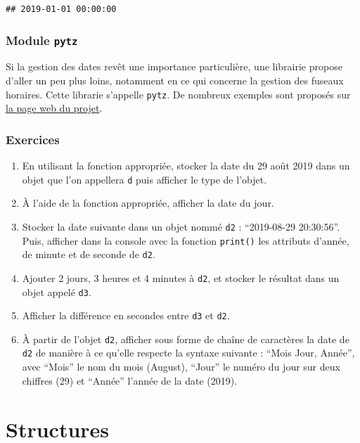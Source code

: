 \documentclass[
  12pt,
]{book}
\makeatletter
\providecommand{\tightlist}{%
  \setlength{\itemsep}{0pt}\setlength{\parskip}{0pt}}
\numberwithin{equation}{section}
\numberwithin{countremarque}{section}
\newcounter{exercices}[section]
\newenvironment{exframe}{%
 \def\at@end@of@exframe{}%
 \ifinner\ifhmode%
  \def\at@end@of@exframe{\end{minipage}}%
  \begin{minipage}{\columnwidth}%
 \fi\fi%
 \def\FrameCommand##1{\hskip\@totalleftmargin \hskip-\fboxsep
 \colorbox{shadecolorex}{##1}\hskip-\fboxsep
     \hskip-\linewidth \hskip-\@totalleftmargin \hskip\columnwidth}%
 \MakeFramed {\advance\hsize-\width
   \@totalleftmargin\z@ \linewidth\hsize
   \@setminipage}}%
 {\par\unskip\endMakeFramed%
 \at@end@of@exframe}
\makeatother
\begin{document}
\begin{lstlisting}
## 2019-01-01 00:00:00
\end{lstlisting}

\subsection{\texorpdfstring{Module \texttt{pytz}}{Module pytz}}\label{module-pytz}

Si la gestion des dates revêt une importance particulière, une librairie propose d'aller un peu plus loins, notamment en ce qui concerne la gestion des fuseaux horaires. Cette librarie s'appelle \texttt{pytz}. De nombreux exemples sont proposés sur \href{https://pypi.org/project/pytz/}{la page web du projet}.

\subsection{Exercices}\label{exercices}

\begin{exframe}
\begin{enumerate}
\def\labelenumi{\arabic{enumi}.}
\tightlist
\item
  En utilisant la fonction appropriée, stocker la date du 29 août 2019 dans un objet que l'on appellera
  \texttt{d} puis afficher le type de l'objet.
\item
  À l'aide de la fonction appropriée, afficher la date du jour.
\item
  Stocker la date suivante dans un objet nommé \texttt{d2} : ``2019-08-29 20:30:56''. Puis, afficher dans la console avec la fonction \texttt{print()} les attributs d'année, de minute et de seconde de \texttt{d2}.
\item
  Ajouter 2 jours, 3 heures et 4 minutes à \texttt{d2}, et stocker le résultat dans un objet appelé \texttt{d3}.
\item
  Afficher la différence en secondes entre \texttt{d3} et \texttt{d2}.
\item
  À partir de l'objet \texttt{d2}, afficher sous forme de chaîne de caractères la date de \texttt{d2} de manière à ce qu'elle respecte la syntaxe suivante : ``Mois Jour, Année'', avec ``Mois'' le nom du mois (August), ``Jour'' le numéro du jour sur deux chiffres (29) et ``Année'' l'année de la date (2019).
\end{enumerate}
\end{exframe}

\chapter{Structures}\label{structures}
\end{document}
